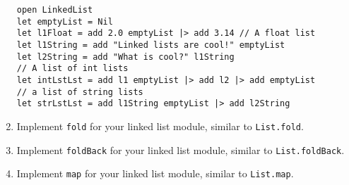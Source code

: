 \begin{enumerate}
\begin{lstlisting}
open LinkedList
let emptyList = Nil
let l1Float = add 2.0 emptyList |> add 3.14 // A float list
let l1String = add "Linked lists are cool!" emptyList
let l2String = add "What is cool?" l1String 
// A list of int lists
let intLstLst = add l1 emptyList |> add l2 |> add emptyList
// a list of string lists
let strLstLst = add l1String emptyList |> add l2String
\end{lstlisting}


\item Implement \texttt{fold} for your linked list module, similar to \texttt{List.fold}.
\item Implement \texttt{foldBack} for your linked list module, similar to \texttt{List.foldBack}.  
\item Implement \texttt{map} for your linked list module, similar to \texttt{List.map}.

\end{enumerate}
